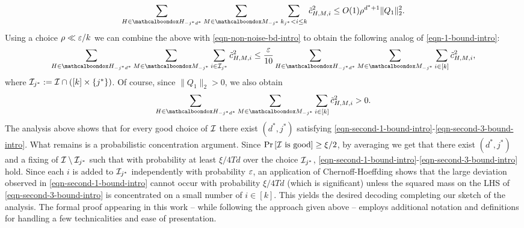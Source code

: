 \begin{equation}\label{eqn-noise-bd-intro}
\sum_{H\in \mcb{H}_{-j^*d^*}}\sum_{M \in
\mcb{M}_{-j^*}}\sum_{k_{j^*} < i \leq k} \tilde{c}_{H,M,i}^2 \leq 
O(1)
\rho^{d^*+1} \|Q_1\|_2^2.
\end{equation}
Using a choice $\rho \ll \varepsilon/k$ we can combine the above with 
\eqref{eqn-non-noise-bd-intro} to obtain the following analog of
\eqref{eqn-1-bound-intro}:
\begin{equation}\label{eqn-second-1-bound-intro}
\sum_{H\in \mcb{H}_{-j^*d^*}}\sum_{M \in
\mcb{M}_{-j^*}}\sum_{i \in \mc{I}_{j^*}} \tilde{c}_{H,M,i}^2 \leq
\frac{\eps}{10} 
\sum_{H\in \mcb{H}_{-j^*d^*}}\sum_{M \in
\mcb{M}_{-j^*}}\sum_{i \in [k]} \tilde{c}_{H,M,i}^2,
\end{equation}
where $\mathcal{I}_{j^*} := \mathcal{I}\cap ([k]\times\{j^*\})$. 
Of course, since $\|Q_1\|_2 > 0$, we also obtain 
\begin{equation}\label{eqn-second-3-bound-intro}
\sum_{H\in \mcb{H}_{-j^*d^*}}\sum_{M \in
\mcb{M}_{-j^*}}\sum_{i \in [k]} \tilde{c}_{H,M,i}^2 > 0.
\end{equation}
The analysis above shows that for every good
choice of $\mathcal{I}$ there exist $(d^*, j^*)$ satisfying
\eqref{eqn-second-1-bound-intro}-\eqref{eqn-second-3-bound-intro}.
What remains is a probabilistic
concentration argument. 
Since $\Pr\left[\mathcal{I} \textnormal{ is good}\right] \geq \xi/2$, by averaging
we get that there exist $(d^*,j^*)$ and a fixing of
$\mathcal{I}\setminus\mathcal{I}_{j^*}$ such that with probability at least
$\xi/4Td$ over
the choice $\mathcal{I}_{j^*}$,
\eqref{eqn-second-1-bound-intro}-\eqref{eqn-second-3-bound-intro}
hold. Since each $i$ is added to $\mathcal{I}_{j^*}$ independently with
probability $\varepsilon$, an application of Chernoff-Hoeffding shows that
the large deviation observed in 
\eqref{eqn-second-1-bound-intro} cannot occur with probability
$\xi/4Td$ (which is significant) unless the squared mass on the LHS of 
\eqref{eqn-second-3-bound-intro} is concentrated on a small number of
$i \in [k]$. This yields the desired decoding completing our sketch of
the analysis. The formal proof appearing in this work -- while
following the approach given above --  employs additional
notation and definitions for handling a few technicalities and ease of
presentation.


